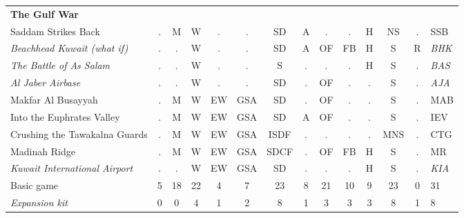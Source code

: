 \documentclass[a4paper]{article}
\newenvironment{texte}{\rmfamily\footnotesize}{}
\begin{document}
\begin{texte}
\begin{tabular}{lccccccccccccl}
\bf The Gulf War \\

     Saddam Strikes Back                           & . &  M &  W &  . &  .  & SD   & A &  . &  . & H & NS  & . &     SSB \\
\it  Beachhead Kuwait (what if)                    & . &  . &  W &  . &  .  & SD   & A & OF & FB & H &  S  & R & \it BHK \\
\it  The Battle of As Salam                        & . &  . &  W &  . &  .  & S    & . &  . &  . & H &  S  & . & \it BAS \\
\it  Al Jaber Airbase                              & . &  . &  W &  . &  .  & SD   & . & OF &  . & . &  S  & . & \it AJA \\
     Makfar Al Busayyah                            & . &  M &  W & EW & GSA & SD   & . & OF &  . & . &  S  & . &     MAB \\
     Into the Euphrates Valley                     & . &  M &  W & EW & GSA & SD   & A & OF &  . & . &  S  & . &     IEV \\
     Crushing the Tawakalna Guards                 & . &  M &  W & EW & GSA & ISDF & . &  . &  . & . & MNS & . &     CTG \\
     Madinah Ridge                                 & . &  M &  W & EW & GSA & SDCF & . & OF & FB & H &  S  & . &     MR  \\
\it  Kuwait International Airport                  & . &  . &  W & EW & GSA & SD   & . &  . &  . & H &  S  & . & \it KIA \\
\hline
    Basic game                                     & 5 & 18 & 22 &  4 &  7  & 23   & 8 & 21 & 10 & 9 & 23  & 0 &     31  \\
\it Expansion kit                                  & 0 &  0 &  4 &  1 &  2  &  8   & 1 &  3 &  3 & 3 &  8  & 1 &     8   \\
\end{tabular}

\end{texte}
\end{document}
